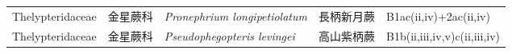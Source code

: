 {\begin{longtable}{p{2.5cm}p{2.5cm}p{4.5cm}p{2.5cm}p{3cm}}
    Thelypteridaceae & 金星蕨科 & \textit{Pronephrium longipetiolatum}  & 長柄新月蕨 & B1ac(ii,iv)+2ac(ii,iv) \index{Pronephrium@\textit{Pronephrium}!longipetiolatum@\textit{longipetiolatum}}  \index{長柄新月蕨} \\
    Thelypteridaceae & 金星蕨科 & \textit{Pseudophegopteris levingei}  & 高山紫柄蕨 & B1b(ii,iii,iv,v)c(ii,iii,iv) \index{Pseudophegopteris@\textit{Pseudophegopteris}!levingei@\textit{levingei}}  \index{高山紫柄蕨} \\
    \bottomrule
        \end{longtable}
        }
    